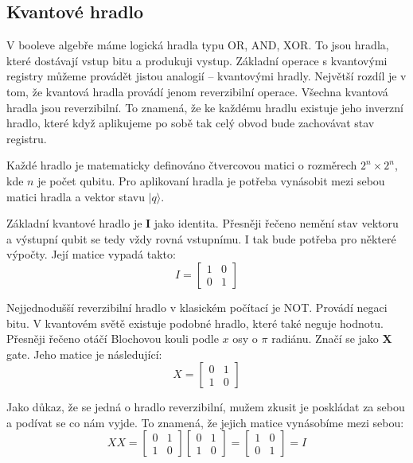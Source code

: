 \documentclass[11pt]{article}
\begin{document}
\subsection{Kvantové hradlo}
V booleve algebře máme logická hradla typu OR, AND, XOR.
To jsou hradla, které dostávají vstup bitu a produkuji vystup.
Základní operace s kvantovými registry můžeme provádět jistou analogií – kvantovými hradly.
Největší rozdíl je v tom, že kvantová hradla provádí jenom reverzibilní operace.
Všechna kvantová hradla jsou reverzibilní.
To znamená, že ke každému hradlu existuje jeho inverzní hradlo, které když aplikujeme po sobě tak celý obvod bude zachovávat stav registru.
\par Každé hradlo je matematicky definováno čtvercovou matici o rozměrech $2^n \times 2^n$, kde $n$ je počet qubitu.
Pro aplikovaní hradla je potřeba vynásobit mezi sebou matici hradla a vektor stavu $|q\rangle$.
\par Základní kvantové hradlo je \textbf{I} jako identita.
Přesněji řečeno nemění stav vektoru a výstupní qubit se tedy vždy rovná vstupnímu. I tak bude potřeba pro některé výpočty.
Její matice vypadá takto:
$$I = \begin{bmatrix}
        1 & 0 \\
        0 & 1
    \end{bmatrix}$$
\par Nejjednodušší reverzibilní hradlo v klasickém počítací je NOT.
Provádí negaci bitu. V kvantovém světě existuje podobné hradlo, které také neguje hodnotu.
Přesněji řečeno otáčí Blochovou kouli podle $x$ osy o $\pi$ radiánu. Značí se jako \textbf{X} gate.
Jeho matice je následující:
$$X = \begin{bmatrix}
        0 & 1 \\
        1 & 0
    \end{bmatrix}$$
\par Jako důkaz, že se jedná o hradlo reverzibilní, mužem zkusit je poskládat za sebou a podívat se co nám vyjde.
To znamená, že jejich matice vynásobíme mezi sebou:
$$XX = \begin{bmatrix}
        0 & 1 \\
        1 & 0
    \end{bmatrix}\begin{bmatrix}
        0 & 1 \\
        1 & 0
    \end{bmatrix} = \begin{bmatrix}
        1 & 0 \\
        0 & 1
    \end{bmatrix} = I$$
\end{document}
